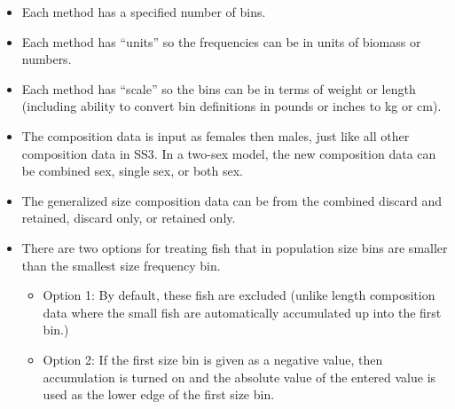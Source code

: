 \begin{itemize}
	\item Each method has a specified number of bins.
	\item Each method has ``units'' so the frequencies can be in units of biomass or numbers.
	\item Each method has ``scale'' so the bins can be in terms of weight or length (including ability to convert bin definitions in pounds or inches to kg or cm). 
	\item The composition data is input as females then males, just like all other composition data in SS3. In a two-sex model, the new composition data can be combined sex, single sex, or both sex.
	\item The generalized size composition data can be from the combined discard and retained, discard only, or retained only.
	\item There are two options for treating fish that in population size bins are smaller than the smallest size frequency bin.
	\begin{itemize}
		\item Option 1: By default, these fish are excluded (unlike length composition data where the small fish are automatically accumulated up into the first bin.)
		\item Option 2: If the first size bin is given as a negative value, then accumulation is turned on and the absolute value of the entered value is used as the lower edge of the first size bin.
	\end{itemize}
\end{itemize}

